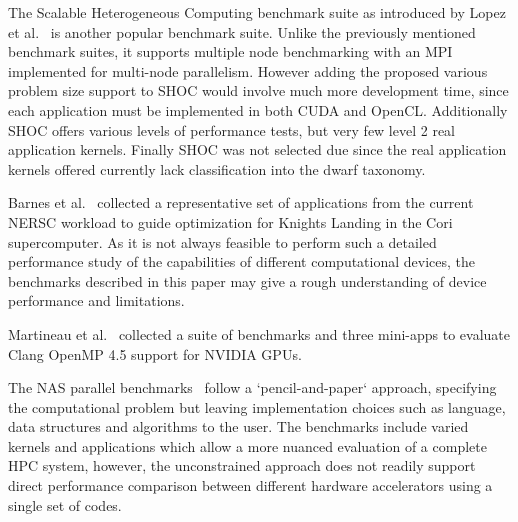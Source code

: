 \documentclass[../document.tex]{subfiles}
\begin{document}
\label{sec:related_work}

The Scalable Heterogeneous Computing benchmark suite as introduced by Lopez et al.~\cite{lopez2015examining} is another popular benchmark suite.
Unlike the previously mentioned benchmark suites, it supports multiple node benchmarking with an MPI implemented for multi-node parallelism. 
However adding the proposed various problem size support to SHOC would involve much more development time, since each application must be implemented in both CUDA and OpenCL.
Additionally SHOC offers various levels of performance tests, but very few level 2 real application kernels.
Finally SHOC was not selected due since the real application kernels offered currently lack classification into the dwarf taxonomy.

Barnes et al.~\cite{barnes2016evaluating} collected a representative set of applications from the current NERSC workload to guide optimization for Knights Landing in the Cori supercomputer.
As it is not always feasible to perform such a detailed performance study of the capabilities of different computational devices, the benchmarks described in this paper may give a rough understanding of device performance and limitations.

Martineau et al.~\cite{martineau2016performance} collected a suite of benchmarks and three mini-apps to evaluate Clang OpenMP 4.5 support for NVIDIA GPUs.

The NAS parallel benchmarks~\cite{bailey1991parallel} follow a `pencil-and-paper` approach, specifying the computational problem but leaving implementation choices such as language, data structures and algorithms to the user.
The benchmarks include varied kernels and applications which allow a more nuanced evaluation of a complete HPC system, however, the unconstrained approach does not readily support direct performance comparison between different hardware accelerators using a single set of codes.
\end{document}
